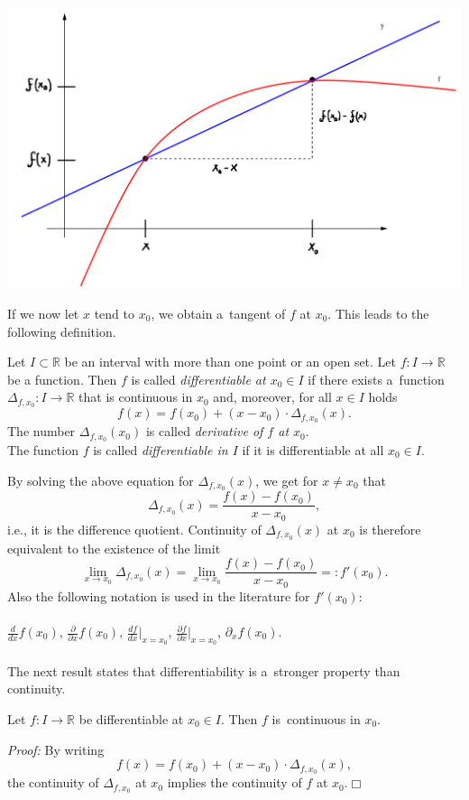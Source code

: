 \includegraphics{./sec.png}

If we now let $x$ tend to $x_0$, we obtain a~tangent of $f$ at $x_0$. This leads to the following definition.
\begin{Definition}{}\label{def:diff}
    Let $I\subset\mathbb{R}$ be an interval with more than one point or
    an open set. Let $f:I\to\mathbb{R}$ be a function. Then $f$ is called \emph{differentiable at $x_0\in I$} if there exists a~function $\Delta_{f,x_0}:I\to\mathbb{R}$ that is continuous in $x_0$ and, moreover, for all $x\in I$ holds
\[f(x)=f(x_0)+(x-x_0)\cdot\Delta_{f,x_0}(x).\]
The number $\Delta_{f,x_0}(x_0)$ is called \emph{derivative of $f$ at $x_0$}.\\
The function $f$ is called \emph{differentiable in $I$} if it is differentiable at all $x_0\in I$.
\end{Definition}
By solving the above equation for $\Delta_{f,x_0}(x)$, we get for $x\neq x_0$ that
\[\Delta_{f,x_0}(x)=\frac{f(x)-f(x_0)}{x-x_0},\]
i.e., it is the difference quotient. Continuity of $\Delta_{f,x_0}(x)$ at $x_0$ is therefore equivalent to the existence of the limit
\[\lim_{x\to x_0}\Delta_{f,x_0}(x)=\lim_{x\to x_0}\frac{f(x)-f(x_0)}{x-x_0}=:f'(x_0).\]
Also the following notation is used in the literature for $f'(x_0)$:
\\ \\
$\frac{d}{dx}f(x_0)$, $\frac{\partial}{\partial x}f(x_0)$, $\frac{d f}{d x}|_{x=x_0}$, $\frac{\partial f}{\partial x}|_{x=x_0}$,
$\partial_xf(x_0)$.
\\ \\

The next result states that differentiability is a~stronger property than continuity.

\begin{Theorem}{}\label{th:diffcont}
    Let $f:I\to\mathbb{R}$ be differentiable at $x_0\in I$. Then $f$ is~continuous in $x_0$.
\end{Theorem}
{\em Proof:} By writing
\[f(x)=f(x_0)+(x-x_0)\cdot\Delta_{f,x_0}(x),\]
the continuity of $\Delta_{f,x_0}$ at $x_0$ implies the continuity of $f$ at $x_0$.\hfill$\Box$


